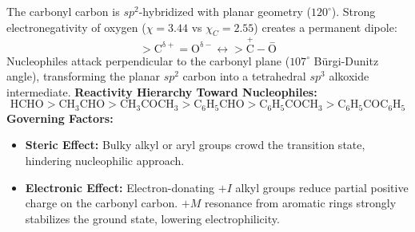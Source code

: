 \documentclass[10pt,a4paper]{article}
\begin{document}
\begin{conceptbox}
The carbonyl carbon is $sp^2$-hybridized with planar geometry ($120^\circ$). Strong electronegativity of oxygen ($\chi=3.44$ vs $\chi_C=2.55$) creates a permanent dipole:
\begin{equation}
  >\mathrm{C^{\delta+}=O^{\delta-}} \longleftrightarrow >\mathrm{\overset{+}{C}-\overset{-}{O}}
\end{equation}
Nucleophiles attack perpendicular to the carbonyl plane ($107^\circ$ Bürgi-Dunitz angle), transforming the planar $sp^2$ carbon into a tetrahedral $sp^3$ alkoxide intermediate.
\textbf{Reactivity Hierarchy Toward Nucleophiles:}
\begin{equation}
  \mathrm{HCHO} > \mathrm{CH_3CHO} > \mathrm{CH_3COCH_3} > \mathrm{C_6H_5CHO} > \mathrm{C_6H_5COCH_3} > \mathrm{C_6H_5COC_6H_5}
\end{equation}
\textbf{Governing Factors:}
\begin{itemize}
  \item \textbf{Steric Effect:} Bulky alkyl or aryl groups crowd the transition state, hindering nucleophilic approach.
  \item \textbf{Electronic Effect:} Electron-donating $+I$ alkyl groups reduce partial positive charge on the carbonyl carbon. $+M$ resonance from aromatic rings strongly stabilizes the ground state, lowering electrophilicity.
\end{itemize}
\end{conceptbox}
\end{document}
